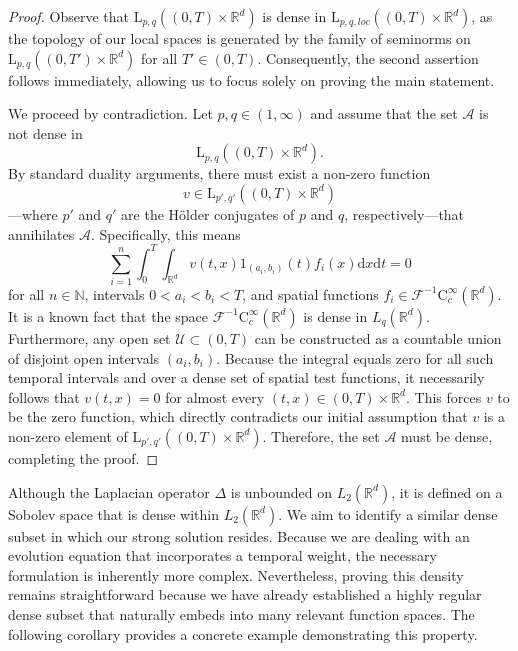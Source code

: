 \documentclass[11pt,reqno]{amsart}
\theoremstyle{definition}
\theoremstyle{remark}
\newcommand\bN{\mathbb{N}}
\newcommand\bR{\mathbb{R}}
\newcommand\cA{\mathcal{A}}
\newcommand\cF{\mathcal{F}}
\newcommand\cU{\mathcal{U}}
\numberwithin{equation}{section}
\begin{document}
\begin{proof}

Observe that $\mathrm{L}_{p,q}\left( (0,T) \times \bR^d \right)$ is dense in $\mathrm{L}_{p,q,loc}\left( (0,T) \times \bR^d \right)$, as the topology of our local spaces is generated by the family of seminorms on $\mathrm{L}_{p,q}\left( (0,T') \times \bR^d \right)$ for all $T' \in (0,T)$. 
Consequently, the second assertion follows immediately, allowing us to focus solely on proving the main statement.



We proceed by contradiction. Let $p, q \in (1,\infty)$ and assume that the set $\cA$ is not dense in
$$
\mathrm{L}_{p,q}\left( (0,T) \times \bR^d \right).
$$
By standard duality arguments, there must exist a non-zero function 
$$
v \in \mathrm{L}_{p',q'}\left( (0,T) \times \bR^d \right)
$$
—where $p'$ and $q'$ are the Hölder conjugates of $p$ and $q$, respectively—that annihilates $\cA$. Specifically, this means
$$
\sum_{i=1}^n \int_0^T \int_{\bR^d} v(t,x) 1_{(a_i,b_i)}(t) f_i(x) \mathrm{d}x \mathrm{d}t = 0
$$
for all $n \in \bN$, intervals $0 < a_i < b_i < T$, and spatial functions $f_i \in \cF^{-1}\mathrm{C}_c^\infty(\bR^d)$.
It is a known fact that the space $\cF^{-1}\mathrm{C}_c^\infty(\bR^d)$ is dense in $L_{q}(\bR^d)$. Furthermore, any open set $\cU \subset (0,T)$ can be constructed as a countable union of disjoint open intervals $(a_i, b_i)$. 
Because the integral equals zero for all such temporal intervals and over a dense set of spatial test functions, it necessarily follows that $v(t,x) = 0$ for almost every $(t,x) \in (0,T) \times \bR^d$.
This forces $v$ to be the zero function, which directly contradicts our initial assumption that $v$ is a non-zero element of $\mathrm{L}_{p',q'}\left( (0,T) \times \bR^d \right)$. 
Therefore, the set $\cA$ must be dense, completing the proof.
\end{proof}





Although the Laplacian operator $\Delta$ is unbounded on $L_2(\bR^d)$, it is defined on a Sobolev space that is dense within $L_2(\bR^d)$. We aim to identify a similar dense subset in which our strong solution resides. 
Because we are dealing with an evolution equation that incorporates a temporal weight, the necessary formulation is inherently more complex. 
Nevertheless, proving this density remains straightforward because we have already established a highly regular dense subset that naturally embeds into many relevant function spaces. 
The following corollary provides a concrete example demonstrating this property.
\end{document}
